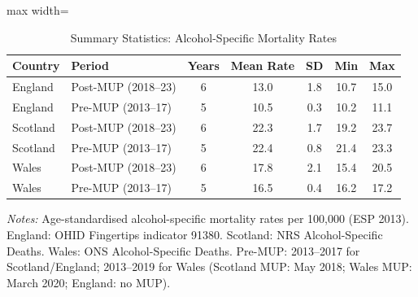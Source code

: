 \begin{table}[htbp]
\centering
\caption{Summary Statistics: Alcohol-Specific Mortality Rates}
\label{tab:summary}
\small
\begin{adjustbox}{max width=\textwidth}
\begin{tabular}{llccccc}
\toprule
Country & Period & Years & Mean Rate & SD & Min & Max \\
\midrule
England & Post-MUP (2018--23) & 6 & 13.0 & 1.8 & 10.7 & 15.0 \\
England & Pre-MUP (2013--17) & 5 & 10.5 & 0.3 & 10.2 & 11.1 \\
\midrule
Scotland & Post-MUP (2018--23) & 6 & 22.3 & 1.7 & 19.2 & 23.7 \\
Scotland & Pre-MUP (2013--17) & 5 & 22.4 & 0.8 & 21.4 & 23.3 \\
\midrule
Wales & Post-MUP (2018--23) & 6 & 17.8 & 2.1 & 15.4 & 20.5 \\
Wales & Pre-MUP (2013--17) & 5 & 16.5 & 0.4 & 16.2 & 17.2 \\
\bottomrule
\end{tabular}
\end{adjustbox}
\par\vspace{0.3em}
{\footnotesize \textit{Notes:} Age-standardised alcohol-specific mortality rates per 100,000 (ESP 2013). England: OHID Fingertips indicator 91380. Scotland: NRS Alcohol-Specific Deaths. Wales: ONS Alcohol-Specific Deaths. Pre-MUP: 2013--2017 for Scotland/England; 2013--2019 for Wales (Scotland MUP: May 2018; Wales MUP: March 2020; England: no MUP).}
\end{table}
